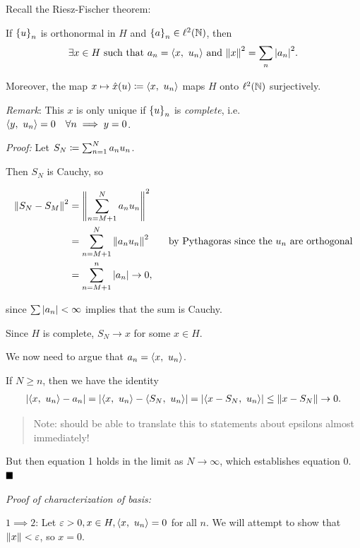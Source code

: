 Recall the Riesz-Fischer theorem:

If \(\left\{{u}\right\}_n\) is orthonormal in \(H\) and
\(\left\{{a}\right\}_n \in \ell^2({\mathbb{N}})\), then
\begin{align*}
\exists x\in H \text{ such that } a_n = {\left\langle {x},~{u_n} \right\rangle} \text{ and } {\left\lVert {x} \right\rVert}^2 = \sum_n {\left\lvert {a_n} \right\rvert}^2.\end{align*}

Moreover, the map \(x \mapsto \hat{x}(u) \coloneqq {\left\langle {x},~{u_n} \right\rangle}\)
maps \(H\) onto \(\ell^2({\mathbb{N}})\) surjectively.

\emph{Remark}: This \(x\) is only unique if \(\left\{{u}\right\}_n\) is
\emph{complete},
i.e.~\({\left\langle {y},~{u_n} \right\rangle} = 0 \quad \forall n \implies y = 0\).

\emph{Proof:} Let \(S_N \coloneqq \sum_{n=1}^N a_n u_n\).

Then \(S_N\) is Cauchy, so

\begin{align*}
{\left\lVert {S_N - S_M} \right\rVert}^2 &= {\left\lVert { \sum_{n=M+1}^N a_n u_n } \right\rVert}^2 \\
&= \sum_{n=M+1}^N  {\left\lVert {a_n u_n} \right\rVert}^2 \quad\quad\text{by Pythagoras since the $u_n$ are orthogonal} \\
&= \sum_{n=M+1}^n {\left\lvert {a_n} \right\rvert} \to 0
,\end{align*}

since \(\sum {\left\lvert {a_n} \right\rvert} < \infty\) implies that the sum is Cauchy.

Since \(H\) is complete, \(S_N \to x\) for some \(x\in H\).

We now need to argue that \(a_n = {\left\langle {x},~{u_n} \right\rangle}\).

If \(N \geq n\), then we have the identity
\begin{align*}
{\left\lvert {{\left\langle {x},~{u_n} \right\rangle} - a_n} \right\rvert} = {\left\lvert {{\left\langle {x},~{u_n} \right\rangle} - {\left\langle {S_N},~{u_n} \right\rangle}  } \right\rvert} = {\left\lvert { {\left\langle {x - S_N},~{u_n} \right\rangle} } \right\rvert} \leq {\left\lVert {x - S_N} \right\rVert} \to 0.
\end{align*}

\begin{quote}
Note: should be able to translate this to statements about epsilons
almost immediately!
\end{quote}

But then equation 1 holds in the limit as \(N \to \infty\), which
establishes equation 0. \(\qed\)

\emph{Proof of characterization of basis:}

\(1 \implies 2\): Let \(\varepsilon > 0, x\in H, {\left\langle {x},~{u_n} \right\rangle} = 0\)
for all \(n\). We will attempt to show that \({\left\lVert {x} \right\rVert} < \varepsilon\),
so \(x = 0\).

